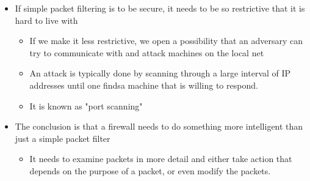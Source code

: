 \documentclass[11pt]{article}
\begin{document}
\begin{itemize}
\begin{itemize}
\item If simple packet filtering is to be secure, it needs to be so restrictive that it is hard to live with
\begin{itemize}
\item If we make it less restrictive, we open a possibility that an adversary can try to communicate with and attack machines on the local net
\item An attack is typically done by scanning through a large interval of IP addresses until one findsa machine that is willing to respond.
\item It is known as "port scanning"
\end{itemize}
\item The conclusion is that a firewall needs to do something more intelligent than just a simple packet filter
\begin{itemize}
\item It needs to examine packets in more detail and either take action that depends on the purpose of a packet, or even modify the packets.
\end{itemize}
\end{itemize}
\end{itemize}
\end{document}
